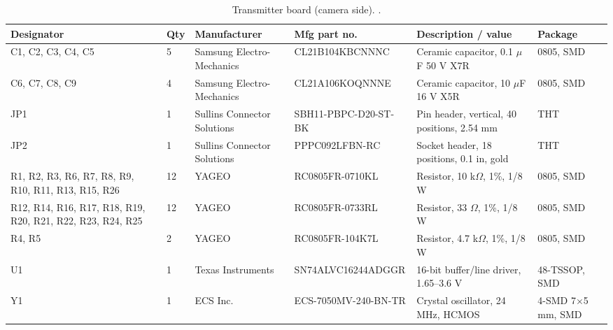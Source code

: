 \begin{landscape}

\begin{table}[htbp]
    \centering
    \begin{tabular}{@{}p{4cm} l p{3cm} l p{5cm} l@{}}
        \toprule
        \textbf{Designator} & \textbf{Qty} & \textbf{Manufacturer} & \textbf{Mfg part no.} & \textbf{Description / value} & \textbf{Package} \\
        \midrule
        C1, C2, C3, C4, C5 & 5 & Samsung Electro-Mechanics & CL21B104KBCNNNC & Ceramic capacitor, 0.1 $\mu$F 50 V X7R & 0805, SMD \\
        \lightmidrule
        C6, C7, C8, C9 & 4 & Samsung Electro-Mechanics & CL21A106KOQNNNE & Ceramic capacitor, 10 $\mu$F 16 V X5R & 0805, SMD \\
        \lightmidrule
        JP1 & 1 & Sullins Connector Solutions & SBH11-PBPC-D20-ST-BK & Pin header, vertical, 40 positions, 2.54 mm & THT \\
        \lightmidrule
        JP2 & 1 & Sullins Connector Solutions & PPPC092LFBN-RC & Socket header, 18 positions, 0.1 in, gold & THT \\
        \lightmidrule
        R1, R2, R3, R6, R7, R8, R9, R10, R11, R13, R15, R26 & 12 & YAGEO & RC0805FR-0710KL & Resistor, 10 k$\Omega$, 1\%, 1/8 W & 0805, SMD \\
        \lightmidrule
        R12, R14, R16, R17, R18, R19, R20, R21, R22, R23, R24, R25 & 12 & YAGEO & RC0805FR-0733RL & Resistor, 33 $\Omega$, 1\%, 1/8 W & 0805, SMD \\
        \lightmidrule
        R4, R5 & 2 & YAGEO & RC0805FR-104K7L & Resistor, 4.7 k$\Omega$, 1\%, 1/8 W & 0805, SMD \\
        \lightmidrule
        U1 & 1 & Texas Instruments & SN74ALVC16244ADGGR & 16-bit buffer/line driver, 1.65--3.6 V & 48-TSSOP, SMD \\
        \lightmidrule
        Y1 & 1 & ECS Inc. & ECS-7050MV-240-BN-TR & Crystal oscillator, 24 MHz, HCMOS & 4-SMD 7$\times$5 mm, SMD \\
        \bottomrule
    \end{tabular}
    \caption{Transmitter board (camera side). .}
    \label{tab:camera-adapter-tx-bom}
\end{table}


\end{landscape}
